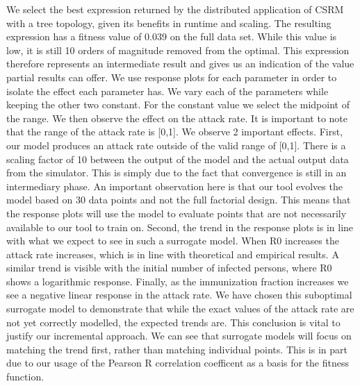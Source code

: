 We select the best expression returned by the distributed application of CSRM with a tree topology, given its benefits in runtime and scaling. The resulting expression has a fitness value of 0.039 on the full data set. While this value is low, it is still 10 orders of magnitude removed from the optimal. This expression therefore represents an intermediate result and gives us an indication of the value partial results can offer. We use response plots for each parameter in order to isolate the effect each parameter has. We vary each of the parameters while keeping the other two constant. For the constant value we select the midpoint of the range. We then observe the effect on the attack rate. It is important to note that the range of the attack rate is [0,1]. We observe 2 important effects. First, our model produces an attack rate outside of the valid range of [0,1]. There is a scaling factor of 10 between the output of the model and the actual output data from the simulator. This is simply due to the fact that convergence is still in an intermediary phase. An important observation here is that our tool evolves the model based on 30 data points and not the full factorial design. This means that the response plots will use the model to evaluate points that are not necessarily available to our tool to train on. Second, the trend in the response plots is in line with what we expect to see in such a surrogate model. When R0 increases the attack rate increases, which is in line with theoretical and empirical results. A similar trend is visible with the initial number of infected persons, where R0 shows a logarithmic response. Finally, as the immunization fraction increases we see a negative linear response in the attack rate. We have chosen this suboptimal surrogate model to demonstrate that while the exact values of the attack rate are not yet correctly modelled, the expected trends are. This conclusion is vital to justify our incremental approach. We can see that surrogate models will focus on matching the trend first, rather than matching individual points. This is in part due to our usage of the Pearson R correlation coefficent as a basis for the fitness function. 